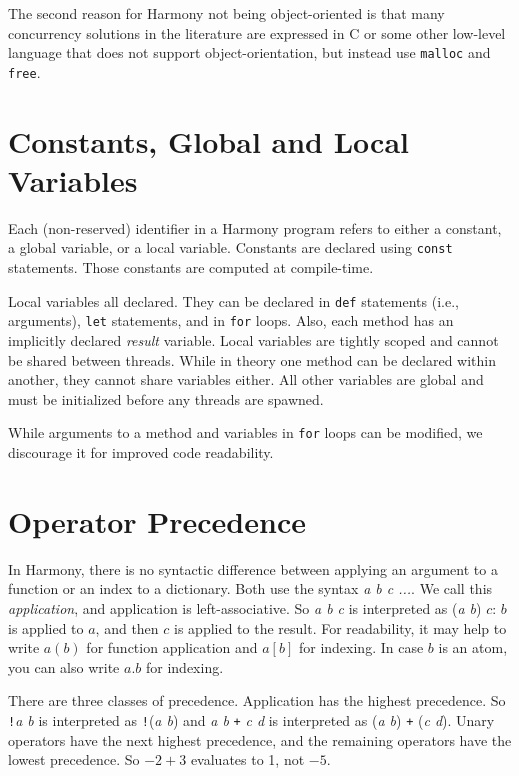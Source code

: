 \documentclass{report}
\begin{document}
The second reason for Harmony not being object-oriented is that
many concurrency solutions in the literature are
expressed in C or some other low-level language that does not support
object-orientation, but instead use \texttt{malloc} and \texttt{free}.

\section{Constants, Global and Local Variables}\label{sec:vars}

Each (non-reserved) identifier in a Harmony program refers to either
a constant, a global variable, or a local variable.
Constants are declared using \texttt{const} statements.
Those constants are computed at compile-time.

Local variables all declared.  They can be declared in
\texttt{def} statements (i.e., arguments),
\texttt{let} statements, and in \texttt{for} loops.
Also, each method has an implicitly declared
\textit{result} variable.
Local variables are tightly scoped and cannot be shared
between threads.
While in theory one method can be declared within another,
they cannot share variables either.
All other variables are global and must be initialized
before any threads are spawned.

While arguments to a method and variables in \texttt{for} loops
can be modified, we discourage it for improved code readability.

\section{Operator Precedence}

In Harmony, there is no syntactic difference between applying an argument to a function
or an index to a dictionary.  Both use the syntax \textit{a b c ...}.
We call this \emph{application}, and application is left-associative.
So \textit{a b c} is interpreted as (\textit{a b}) $c$: $b$ is applied to $a$,
and then $c$ is applied to the result.
For readability, it may help to write $a(b)$ for function application and
$a[b]$ for indexing.  In case $b$ is an atom, you can also write $a.b$ for indexing.

There are three classes of precedence.
Application has the highest precedence.  So \texttt{!}\textit{a b} is interpreted as
\texttt{!}(\textit{a b}) and \textit{a b} \texttt{+} \textit{c d} is interpreted as
(\textit{a b}) \texttt{+} (\textit{c d}).
Unary operators have the next highest precedence,
and the remaining operators have the lowest precedence.
So $-2 + 3$ evaluates to 1, not $-5$.
\end{document}
